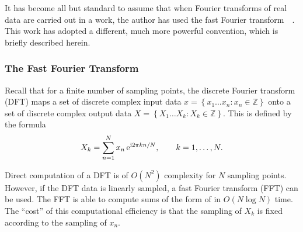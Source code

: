 It has become all but standard to assume that when Fourier transforms of
real data are carried out in a work, the author has used the fast Fourier
transform~\cite{frigo1998fftw}~\cite{cooley1965algorithm}.  This work has
adopted a different, much more powerful convention, which is briefly
described herein.

\subsubsection{The Fast Fourier Transform}
Recall that for a finite number of sampling points, the discrete
Fourier transform (DFT) maps a set of discrete complex input data
$x = \left\{x_1\dots x_n : x_n\in\mathbb{Z}\right\}$ onto a set of
discrete complex output data $X =
\left\{X_1\dots X_k : X_k\in\mathbb{Z}\right\}$.  This is defined by the
formula
\begin{equation}
X_k = \sum_{n=1}^{N} x_n\, {\mathrm{e}}^{{\mathrm{i}} 2\pi k n/N}, \qquad k=1,\ldots,N.
\label{eqn:dft}
\end{equation}

Direct computation of a DFT is of $O(N^2)$ complexity for $N$ sampling
points.  However, if the DFT data is linearly sampled, a fast Fourier
transform (FFT) can be used. The FFT is able to compute sums of the form of
 in $O(N \log N)$ time.  The ``cost'' of this
computational efficiency is that the sampling of $X_k$ is fixed
according to the sampling of $x_n$.

